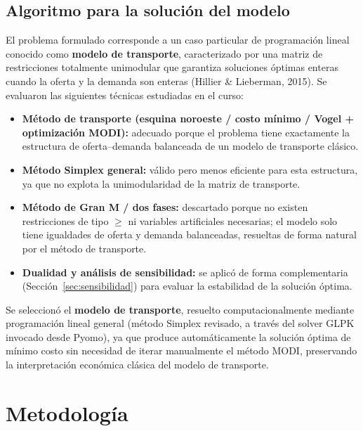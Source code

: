 \documentclass[11pt,a4paper]{article}
\begin{document}
\subsection{Algoritmo para la soluci\'on del modelo}
El problema formulado corresponde a un caso particular de programaci\'on lineal conocido como \textbf{modelo de transporte}, caracterizado por una matriz de restricciones totalmente unimodular que garantiza soluciones \'optimas enteras cuando la oferta y la demanda son enteras (Hillier \& Lieberman, 2015). Se evaluaron las siguientes t\'ecnicas estudiadas en el curso:

\begin{itemize}
  \item \textbf{M\'etodo de transporte (esquina noroeste / costo m\'inimo / Vogel + optimizaci\'on MODI):} adecuado porque el problema tiene exactamente la estructura de oferta--demanda balanceada de un modelo de transporte cl\'asico.
  \item \textbf{M\'etodo Simplex general:} v\'alido pero menos eficiente para esta estructura, ya que no explota la unimodularidad de la matriz de transporte.
  \item \textbf{M\'etodo de Gran M / dos fases:} descartado porque no existen restricciones de tipo $\ge$ ni variables artificiales necesarias; el modelo solo tiene igualdades de oferta y demanda balanceadas, resueltas de forma natural por el m\'etodo de transporte.
  \item \textbf{Dualidad y an\'alisis de sensibilidad:} se aplic\'o de forma complementaria (Secci\'on~\ref{sec:sensibilidad}) para evaluar la estabilidad de la soluci\'on \'optima.
\end{itemize}

Se seleccion\'o el \textbf{modelo de transporte}, resuelto computacionalmente mediante programaci\'on lineal general (m\'etodo Simplex revisado, a trav\'es del solver GLPK invocado desde Pyomo), ya que produce autom\'aticamente la soluci\'on \'optima de m\'inimo costo sin necesidad de iterar manualmente el m\'etodo MODI, preservando la interpretaci\'on econ\'omica cl\'asica del modelo de transporte.

\section{Metodolog\'ia}
\end{document}
